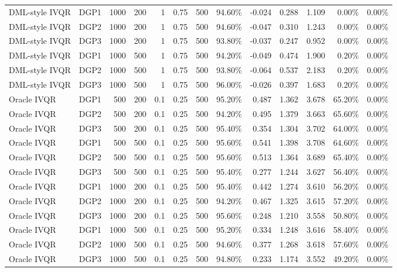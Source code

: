 \begin{landscape}
\begin{longtable}{llrrrrrrrrrrr}
DML-style IVQR & DGP1 & 1000 & 200 & 1 & 0.75 & 500 & 94.60\% & -0.024 & 0.288 & 1.109 & 0.00\% & 0.00\% \\
DML-style IVQR & DGP2 & 1000 & 200 & 1 & 0.75 & 500 & 94.60\% & -0.047 & 0.310 & 1.243 & 0.00\% & 0.00\% \\
DML-style IVQR & DGP3 & 1000 & 200 & 1 & 0.75 & 500 & 93.80\% & -0.037 & 0.247 & 0.952 & 0.00\% & 0.00\% \\
DML-style IVQR & DGP1 & 1000 & 500 & 1 & 0.75 & 500 & 94.20\% & -0.049 & 0.474 & 1.900 & 0.20\% & 0.00\% \\
DML-style IVQR & DGP2 & 1000 & 500 & 1 & 0.75 & 500 & 93.80\% & -0.064 & 0.537 & 2.183 & 0.20\% & 0.00\% \\
DML-style IVQR & DGP3 & 1000 & 500 & 1 & 0.75 & 500 & 96.00\% & -0.026 & 0.397 & 1.683 & 0.20\% & 0.00\% \\
Oracle IVQR & DGP1 & 500 & 200 & 0.1 & 0.25 & 500 & 95.20\% & 0.487 & 1.362 & 3.678 & 65.20\% & 0.00\% \\
Oracle IVQR & DGP2 & 500 & 200 & 0.1 & 0.25 & 500 & 94.20\% & 0.495 & 1.379 & 3.663 & 65.60\% & 0.00\% \\
Oracle IVQR & DGP3 & 500 & 200 & 0.1 & 0.25 & 500 & 95.40\% & 0.354 & 1.304 & 3.702 & 64.00\% & 0.00\% \\
Oracle IVQR & DGP1 & 500 & 500 & 0.1 & 0.25 & 500 & 95.60\% & 0.541 & 1.398 & 3.708 & 64.60\% & 0.00\% \\
Oracle IVQR & DGP2 & 500 & 500 & 0.1 & 0.25 & 500 & 95.60\% & 0.513 & 1.364 & 3.689 & 65.40\% & 0.00\% \\
Oracle IVQR & DGP3 & 500 & 500 & 0.1 & 0.25 & 500 & 95.40\% & 0.277 & 1.244 & 3.627 & 56.40\% & 0.00\% \\
Oracle IVQR & DGP1 & 1000 & 200 & 0.1 & 0.25 & 500 & 95.40\% & 0.442 & 1.274 & 3.610 & 56.20\% & 0.00\% \\
Oracle IVQR & DGP2 & 1000 & 200 & 0.1 & 0.25 & 500 & 94.20\% & 0.467 & 1.325 & 3.615 & 57.20\% & 0.00\% \\
Oracle IVQR & DGP3 & 1000 & 200 & 0.1 & 0.25 & 500 & 95.60\% & 0.248 & 1.210 & 3.558 & 50.80\% & 0.00\% \\
Oracle IVQR & DGP1 & 1000 & 500 & 0.1 & 0.25 & 500 & 95.20\% & 0.334 & 1.248 & 3.616 & 58.40\% & 0.00\% \\
Oracle IVQR & DGP2 & 1000 & 500 & 0.1 & 0.25 & 500 & 94.60\% & 0.377 & 1.268 & 3.618 & 57.60\% & 0.00\% \\
Oracle IVQR & DGP3 & 1000 & 500 & 0.1 & 0.25 & 500 & 94.80\% & 0.233 & 1.174 & 3.552 & 49.20\% & 0.00\% \\

\end{longtable}
\end{landscape}
